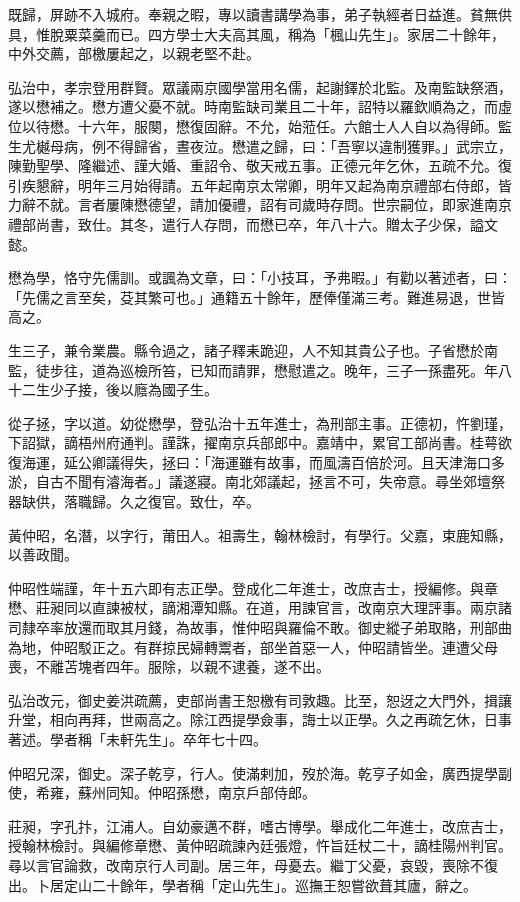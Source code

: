 \begin{pinyinscope}
既歸，屏跡不入城府。奉親之暇，專以讀書講學為事，弟子執經者日益進。貧無供具，惟脫粟菜羹而已。四方學士大夫高其風，稱為「楓山先生」。家居二十餘年，中外交薦，部檄屢起之，以親老堅不赴。

弘治中，孝宗登用群賢。眾議兩京國學當用名儒，起謝鐸於北監。及南監缺祭酒，遂以懋補之。懋方遭父憂不就。時南監缺司業且二十年，詔特以羅欽順為之，而虛位以待懋。十六年，服闋，懋復固辭。不允，始蒞任。六館士人人自以為得師。監生尤樾母病，例不得歸省，晝夜泣。懋遣之歸，曰：「吾寧以違制獲罪。」武宗立，陳勤聖學、隆繼述、謹大婚、重詔令、敬天戒五事。正德元年乞休，五疏不允。復引疾懇辭，明年三月始得請。五年起南京太常卿，明年又起為南京禮部右侍郎，皆力辭不就。言者屢陳懋德望，請加優禮，詔有司歲時存問。世宗嗣位，即家進南京禮部尚書，致仕。其冬，遣行人存問，而懋已卒，年八十六。贈太子少保，謚文懿。

懋為學，恪守先儒訓。或諷為文章，曰：「小技耳，予弗暇。」有勸以著述者，曰：「先儒之言至矣，芟其繁可也。」通籍五十餘年，歷俸僅滿三考。難進易退，世皆高之。

生三子，兼令業農。縣令過之，諸子釋耒跪迎，人不知其貴公子也。子省懋於南監，徒步往，道為巡檢所笞，已知而請罪，懋慰遣之。晚年，三子一孫盡死。年八十二生少子接，後以廕為國子生。

從子拯，字以道。幼從懋學，登弘治十五年進士，為刑部主事。正德初，忤劉瑾，下詔獄，謫梧州府通判。謹誅，擢南京兵部郎中。嘉靖中，累官工部尚書。桂萼欲復海運，延公卿議得失，拯曰：「海運雖有故事，而風濤百倍於河。且天津海口多淤，自古不聞有濬海者。」議遂寢。南北郊議起，拯言不可，失帝意。尋坐郊壇祭器缺供，落職歸。久之復官。致仕，卒。

黃仲昭，名潛，以字行，莆田人。祖壽生，翰林檢討，有學行。父嘉，束鹿知縣，以善政聞。

仲昭性端謹，年十五六即有志正學。登成化二年進士，改庶吉士，授編修。與章懋、莊昶同以直諫被杖，謫湘潭知縣。在道，用諫官言，改南京大理評事。兩京諸司隸卒率放還而取其月錢，為故事，惟仲昭與羅倫不敢。御史縱子弟取賂，刑部曲為地，仲昭駁正之。有群掠民婦轉鬻者，部坐首惡一人，仲昭請皆坐。連遭父母喪，不離苫塊者四年。服除，以親不逮養，遂不出。

弘治改元，御史姜洪疏薦，吏部尚書王恕檄有司敦趣。比至，恕迓之大門外，揖讓升堂，相向再拜，世兩高之。除江西提學僉事，誨士以正學。久之再疏乞休，日事著述。學者稱「未軒先生」。卒年七十四。

仲昭兄深，御史。深子乾亨，行人。使滿剌加，歿於海。乾亨子如金，廣西提學副使，希雍，蘇州同知。仲昭孫懋，南京戶部侍郎。

莊昶，字孔抃，江浦人。自幼豪邁不群，嗜古博學。舉成化二年進士，改庶吉士，授翰林檢討。與編修章懋、黃仲昭疏諫內廷張燈，忤旨廷杖二十，謫桂陽州判官。尋以言官論救，改南京行人司副。居三年，母憂去。繼丁父憂，哀毀，喪除不復出。卜居定山二十餘年，學者稱「定山先生」。巡撫王恕嘗欲葺其廬，辭之。


\end{pinyinscope}
